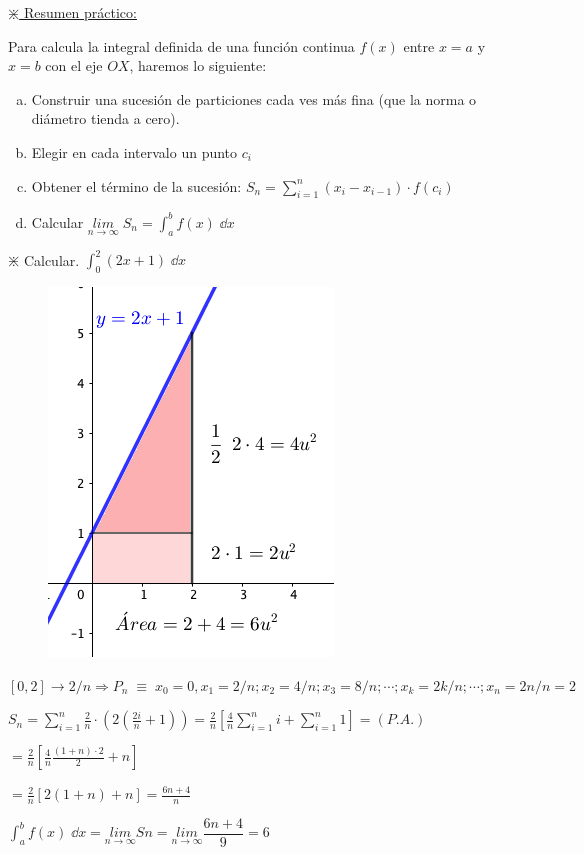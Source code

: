 \vspace{4mm}

\underline{$\divideontimes$ Resumen práctico:}


Para calcula la integral definida de una función continua $f(x)$ entre $x=a$ y $x=b$ con el eje $OX$, haremos lo siguiente:

\begin{enumerate}[a) ]
	\item Construir una sucesión de particiones cada ves más fina (que la norma o diámetro tienda a cero).
	\vspace{-3mm} \item Elegir en cada intervalo un punto $c_i$
	\vspace{-3mm} \item Obtener el término de la sucesión: $\displaystyle S_n= \sum _{ i=1 }^{ n }{ ({ x }_{ i }-{ x }_{ i-1 })\cdot f({ c }_{ i }) } \; $
	\vspace{-3mm} \item Calcular $\displaystyle \underset {n\to \infty}{lim}\; {S_n}=  \int_a^b f(x)\; \dd x$
\end{enumerate}


\begin{ejem}
\label{trapecio-mixtilineo}
	$\divideontimes$ Calcular. $\displaystyle \int_0^2 (2x+1) \; \dd x$
\begin{multicols}{2}	
	\begin{figure}[H]
	\centering
	\includegraphics[width=.3\textwidth]{imagenes/imagenes08/T08IM04.png}
\end{figure}
	$[0,2] \to 2/n \Rightarrow P_n\; \equiv \; x_0=0, x_1=2/n; x_2=4/n; x_3= 8/n; \cdots ; x_k=2k/n; \cdots ; x_n=2n/n=2 $
	
	$\displaystyle { S }_{ n }=\sum _{ i=1 }^{ n }{ \frac { 2 }{ n }  } \cdot \left( 2\left( \frac { 2i }{ n } +1 \right)  \right) = \frac { 2 }{ n } \left[ \frac { 4 }{ n } \sum _{ i=1 }^{ n }{ i } +\sum _{ i=1 }^{ n }{ 1 }  \right] =\left( P.A. \right) $
	
	$= \displaystyle \frac { 2 }{ n } \left[ \frac { 4 }{ n } \frac { (1+n)\cdot 2 }{ 2 } +n \right]$
	
	$ =\displaystyle \frac { 2 }{ n } \left[ 2\left( 1+n \right) +n \right] =\frac { 6n+4 }{ n } $
\end{multicols}
$\displaystyle \int_a^b f(x)\; \dd x = \underset {n\to \infty}{lim}{Sn}=\displaystyle \underset {n\to \infty}{lim}{\dfrac {6n+4}{9}}= 6$
\end{ejem}

